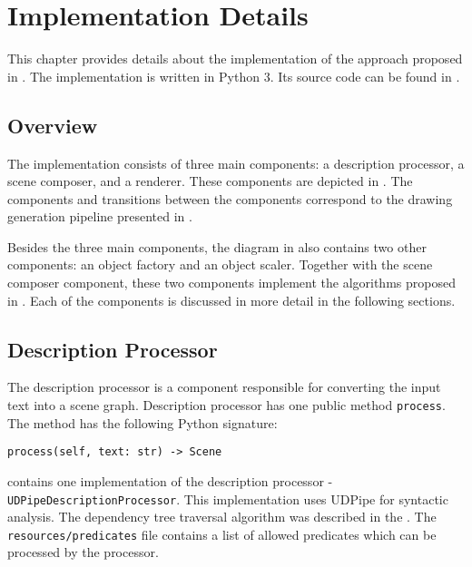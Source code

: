 \chapter{Implementation Details}
\label{chap:impl_details}

This chapter provides details about the implementation of the approach proposed in . The implementation is written in Python 3. Its source code can be found in .

\section{Overview}

The implementation consists of three main components: a description processor, a scene composer, and a renderer. These components are depicted in . The components and transitions between the components correspond to the drawing generation pipeline presented in .


Besides the three main components, the diagram in  also contains two other components: an object factory and an object scaler. Together with the scene composer component, these two components implement the algorithms proposed in . Each of the components is discussed in more detail in the following sections.

\section{Description Processor}

The description processor is a component responsible for converting the input text into a scene graph. Description processor has one public method \verb|process|. The method has the following Python signature: 
\begin{verbatim}
process(self, text: str) -> Scene
\end{verbatim}

 contains one implementation of the description processor - \break \verb|UDPipeDescriptionProcessor|. This implementation uses UDPipe \citep{straka2018udpipe} for syntactic analysis. The dependency tree traversal algorithm was described in the . The \verb|resources/predicates| file contains a list of allowed predicates which can be processed by the processor.

